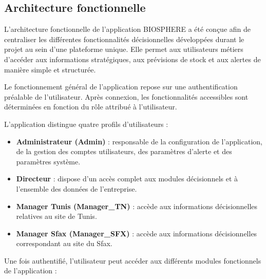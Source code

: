 \subsection{Architecture fonctionnelle}

L'architecture fonctionnelle de l'application BIOSPHERE a été conçue afin de centraliser les différentes fonctionnalités décisionnelles développées durant le projet au sein d'une plateforme unique. Elle permet aux utilisateurs métiers d'accéder aux informations stratégiques, aux prévisions de stock et aux alertes de manière simple et structurée.

Le fonctionnement général de l'application repose sur une authentification préalable de l'utilisateur. Après connexion, les fonctionnalités accessibles sont déterminées en fonction du rôle attribué à l'utilisateur.

L'application distingue quatre profils d'utilisateurs :

\begin{itemize}
    \item \textbf{Administrateur (Admin)} : responsable de la configuration de l'application, de la gestion des comptes utilisateurs, des paramètres d'alerte et des paramètres système.
    
    \item \textbf{Directeur} : dispose d'un accès complet aux modules décisionnels et à l'ensemble des données de l'entreprise.
    
    \item \textbf{Manager Tunis (Manager\_TN)} : accède aux informations décisionnelles relatives au site de Tunis.
    
    \item \textbf{Manager Sfax (Manager\_SFX)} : accède aux informations décisionnelles correspondant au site du Sfax.
\end{itemize}

Une fois authentifié, l'utilisateur peut accéder aux différents modules fonctionnels de l'application :


